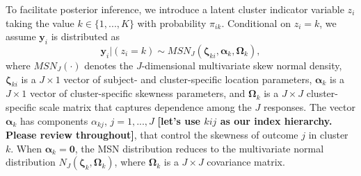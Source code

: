 \documentclass[useAMS,referee]{biom}
\begin{document}
To facilitate posterior inference, we introduce a latent cluster indicator variable $z_i$ taking the value $k \in \{1,...,K\}$ with probability $\pi_{ik}$. Conditional on $z_i = k$, we assume $\mathbf{y}_{i}$ is distributed as
\begin{equation}
\mathbf{y}_{i}|(z_i=k) \sim MSN_J(\boldsymbol\zeta_{ki},\boldsymbol\alpha_k,\boldsymbol\Omega_k), \label{eq:msndens}
\end{equation}
where $MSN_J(\cdot)$ denotes the $J$-dimensional multivariate skew normal density, $\boldsymbol\zeta_{ki}$ is a $J \times 1$ vector of subject- and cluster-specific location parameters, $\boldsymbol\alpha_k$ is a $J \times 1$ vector of cluster-specific skewness parameters, and $\boldsymbol\Omega_k$ is a $J \times J$ cluster-specific scale matrix that captures dependence among the $J$ responses. The vector $\boldsymbol\alpha_k$ has components $\alpha_{kj}$, $j = 1,...,J$ \textbf{[let's use $kij$ as our index hierarchy. Please review throughout]}, that control the skewness of outcome $j$ in cluster $k$. When $\boldsymbol\alpha_k = \mathbf{0}$, the MSN distribution reduces to the multivariate normal distribution $N_J(\boldsymbol\zeta_k,\boldsymbol\Omega_k)$, where $\boldsymbol\Omega_k$ is a $J \times J$ covariance matrix.
\end{document}
